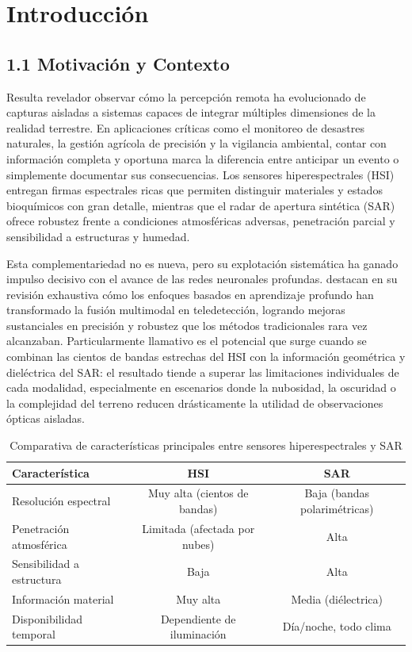 \section{Introducción}

\subsection{1.1 Motivación y Contexto}

Resulta revelador observar cómo la percepción remota ha evolucionado de capturas aisladas a sistemas capaces de integrar múltiples dimensiones de la realidad terrestre. En aplicaciones críticas como el monitoreo de desastres naturales, la gestión agrícola de precisión y la vigilancia ambiental, contar con información completa y oportuna marca la diferencia entre anticipar un evento o simplemente documentar sus consecuencias. Los sensores hiperespectrales (HSI) entregan firmas espectrales ricas que permiten distinguir materiales y estados bioquímicos con gran detalle, mientras que el radar de apertura sintética (SAR) ofrece robustez frente a condiciones atmosféricas adversas, penetración parcial y sensibilidad a estructuras y humedad.

Esta complementariedad no es nueva, pero su explotación sistemática ha ganado impulso decisivo con el avance de las redes neuronales profundas. \cite{Li2022Deep} destacan en su revisión exhaustiva cómo los enfoques basados en aprendizaje profundo han transformado la fusión multimodal en teledetección, logrando mejoras sustanciales en precisión y robustez que los métodos tradicionales rara vez alcanzaban. Particularmente llamativo es el potencial que surge cuando se combinan las cientos de bandas estrechas del HSI con la información geométrica y dieléctrica del SAR: el resultado tiende a superar las limitaciones individuales de cada modalidad, especialmente en escenarios donde la nubosidad, la oscuridad o la complejidad del terreno reducen drásticamente la utilidad de observaciones ópticas aisladas.

\begin{table}[h]
\centering
\caption{Comparativa de características principales entre sensores hiperespectrales y SAR}
\label{tab:comparativa_sensores}
\begin{tabular}{lcc}
\hline
\textbf{Característica} & \textbf{HSI} & \textbf{SAR} \\
\hline
Resolución espectral & Muy alta (cientos de bandas) & Baja (bandas polarimétricas) \\
Penetración atmosférica & Limitada (afectada por nubes) & Alta \\
Sensibilidad a estructura & Baja & Alta \\
Información material & Muy alta & Media (diélectrica) \\
Disponibilidad temporal & Dependiente de iluminación & Día/noche, todo clima \\
\hline
\end{tabular}
\end{table}

